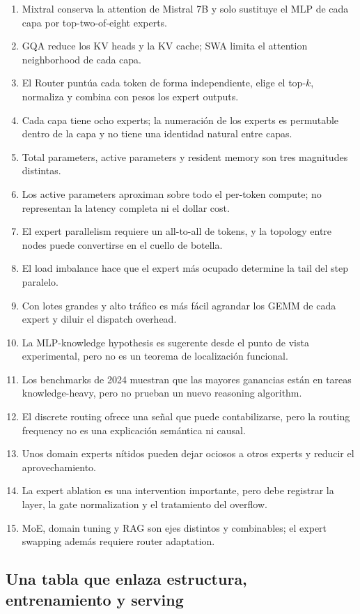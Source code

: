 \begin{enumerate}
  \item Mixtral conserva la attention de Mistral 7B y solo sustituye el MLP de cada capa por top-two-of-eight experts.
  \item GQA reduce los KV heads y la KV cache; SWA limita el attention neighborhood de cada capa.
  \item El Router puntúa cada token de forma independiente, elige el top-$k$, normaliza y combina con pesos los expert outputs.
  \item Cada capa tiene ocho experts; la numeración de los experts es permutable dentro de la capa y no tiene una identidad natural entre capas.
  \item Total parameters, active parameters y resident memory son tres magnitudes distintas.
  \item Los active parameters aproximan sobre todo el per-token compute; no representan la latency completa ni el dollar cost.
  \item El expert parallelism requiere un all-to-all de tokens, y la topology entre nodes puede convertirse en el cuello de botella.
  \item El load imbalance hace que el expert más ocupado determine la tail del step paralelo.
  \item Con lotes grandes y alto tráfico es más fácil agrandar los GEMM de cada expert y diluir el dispatch overhead.
  \item La MLP-knowledge hypothesis es sugerente desde el punto de vista experimental, pero no es un teorema de localización funcional.
  \item Los benchmarks de 2024 muestran que las mayores ganancias están en tareas knowledge-heavy, pero no prueban un nuevo reasoning algorithm.
  \item El discrete routing ofrece una señal que puede contabilizarse, pero la routing frequency no es una explicación semántica ni causal.
  \item Unos domain experts nítidos pueden dejar ociosos a otros experts y reducir el aprovechamiento.
  \item La expert ablation es una intervention importante, pero debe registrar la layer, la gate normalization y el tratamiento del overflow.
  \item MoE, domain tuning y RAG son ejes distintos y combinables; el expert swapping además requiere router adaptation.
\end{enumerate}

\subsection{Una tabla que enlaza estructura, entrenamiento y serving}

